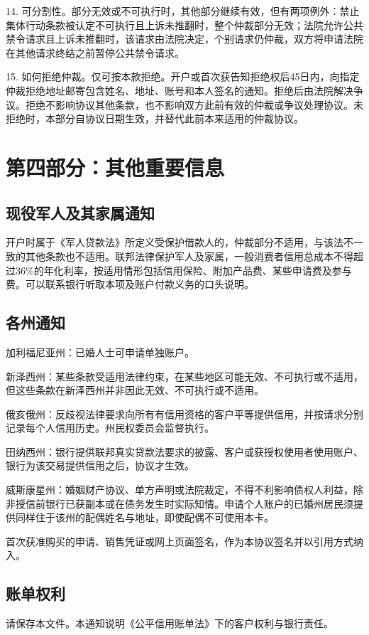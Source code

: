 \documentclass[UTF8,fontset=none,11pt,a4paper]{ctexart}
\begin{document}
14. 可分割性。部分无效或不可执行时，其他部分继续有效，但有两项例外：禁止集体行动条款被认定不可执行且上诉未推翻时，整个仲裁部分无效；法院允许公共禁令请求且上诉未推翻时，该请求由法院决定，个别请求仍仲裁，双方将申请法院在其他请求终结之前暂停公共禁令请求。


15. 如何拒绝仲裁。仅可按本款拒绝。开户或首次获告知拒绝权后45日内，向指定仲裁拒绝地址邮寄包含姓名、地址、账号和本人签名的通知。拒绝后由法院解决争议。拒绝不影响协议其他条款，也不影响双方此前有效的仲裁或争议处理协议。未拒绝时，本部分自协议日期生效，并替代此前本来适用的仲裁协议。


\section*{第四部分：其他重要信息}
\subsection*{现役军人及其家属通知}
开户时属于《军人贷款法》所定义受保护借款人的，仲裁部分不适用，与该法不一致的其他条款也不适用。联邦法律保护军人及家属，一般消费者信用总成本不得超过36\%的年化利率，按适用情形包括信用保险、附加产品费、某些申请费及参与费。可以联系银行听取本项及账户付款义务的口头说明。


\subsection*{各州通知}
加利福尼亚州：已婚人士可申请单独账户。


新泽西州：某些条款受适用法律约束，在某些地区可能无效、不可执行或不适用，但这些条款在新泽西州并非因此无效、不可执行或不适用。


俄亥俄州：反歧视法律要求向所有有信用资格的客户平等提供信用，并按请求分别记录每个人信用历史。州民权委员会监督执行。


田纳西州：银行提供联邦真实贷款法要求的披露、客户或获授权使用者使用账户、银行为该交易提供信用之后，协议才生效。


威斯康星州：婚姻财产协议、单方声明或法院裁定，不得不利影响债权人利益，除非授信前银行已获副本或在债务发生时实际知情。申请个人账户的已婚州居民须提供同样住于该州的配偶姓名与地址，即使配偶不可使用本卡。


首次获准购买的申请、销售凭证或网上页面签名，作为本协议签名并以引用方式纳入。


\subsection*{账单权利}
请保存本文件。本通知说明《公平信用账单法》下的客户权利与银行责任。
\end{document}
